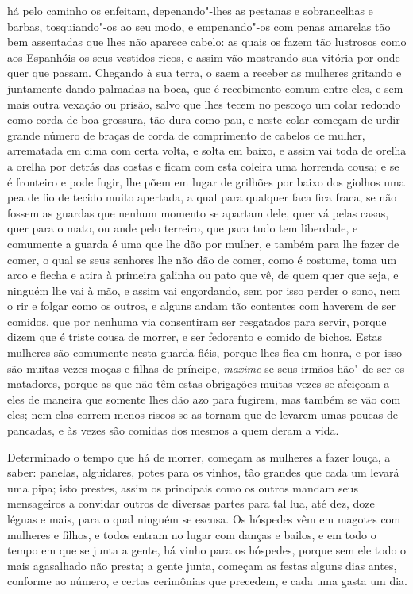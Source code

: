 há pelo caminho os enfeitam, depenando"-lhes as pestanas e sobrancelhas
e barbas, tosquiando"-os ao seu modo, e empenando"-os com penas amarelas
tão bem assentadas que lhes não aparece cabelo: as quais os fazem tão
lustrosos como aos Espanhóis os seus vestidos ricos, e assim vão
mostrando sua vitória por onde quer que passam. Chegando à sua terra,
o saem a receber as mulheres gritando e juntamente dando palmadas na
boca, que é recebimento comum entre eles, e sem mais outra vexação ou
prisão, salvo que lhes tecem no pescoço um colar redondo como corda de
boa grossura, tão dura como pau, e neste colar começam de urdir grande
número de braças de corda de comprimento de cabelos de mulher,
arrematada em cima com certa volta, e solta em baixo, e assim vai toda
de orelha a orelha por detrás das costas e ficam com esta coleira uma
horrenda cousa; e se é fronteiro e pode fugir, lhe põem em lugar de
grilhões por baixo dos giolhos uma pea de fio de tecido muito apertada,
a qual para qualquer faca fica fraca, se não fossem as guardas que
nenhum momento se apartam dele, quer vá pelas casas, quer para o mato,
ou ande pelo terreiro, que para tudo tem liberdade, e comumente a
guarda é uma que lhe dão por mulher, e também para lhe fazer de comer,
o qual se seus senhores lhe não dão de comer, como é costume, toma um
arco e flecha e atira à primeira galinha ou pato que vê, de quem quer
que seja, e ninguém lhe vai à mão, e assim vai engordando, sem por isso
perder o sono, nem o rir e folgar como os outros, e alguns andam tão
contentes com haverem de ser comidos, que por nenhuma via consentiram
ser resgatados para servir, porque dizem que é triste cousa de morrer,
e ser fedorento e comido de bichos. Estas mulheres são comumente nesta
guarda fiéis, porque lhes fica em honra, e por isso são muitas vezes
moças e filhas de príncipe, \textit{maxime} se seus irmãos hão"-de ser os
matadores, porque as que não têm estas obrigações muitas vezes se
afeiçoam a eles de maneira que somente lhes dão azo para fugirem, mas
também se vão com eles; nem elas correm menos riscos se as tornam que
de levarem umas poucas de pancadas, e às vezes são comidas dos mesmos a
quem deram a vida.

 Determinado o tempo que há de morrer, começam as mulheres a fazer
louça, a saber: panelas, alguidares, potes para os vinhos, tão grandes
que cada um levará uma pipa; isto prestes, assim os principais como os
outros mandam seus mensageiros a convidar outros de diversas partes
para tal lua, até dez, doze léguas e mais, para o qual ninguém se
escusa. Os hóspedes vêm em magotes com mulheres e filhos, e todos
entram no lugar com danças e bailos, e em todo o tempo em que se junta
a gente, há vinho para os hóspedes, porque sem ele todo o mais
agasalhado não presta; a gente junta, começam as festas alguns dias
antes, conforme ao número, e certas cerimônias que precedem, e cada uma
gasta um dia.

